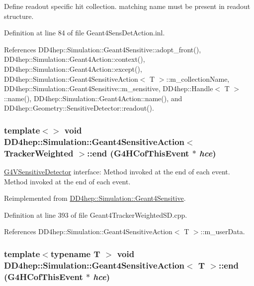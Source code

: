 Define readout specific hit collection. matching name must be present in readout structure. 

Definition at line 84 of file Geant4SensDetAction.inl.

References DD4hep::Simulation::Geant4Sensitive::adopt\_\-front(), DD4hep::Simulation::Geant4Action::context(), DD4hep::Simulation::Geant4Action::except(), DD4hep::Simulation::Geant4SensitiveAction$<$ T $>$::m\_\-collectionName, DD4hep::Simulation::Geant4Sensitive::m\_\-sensitive, DD4hep::Handle$<$ T $>$::name(), DD4hep::Simulation::Geant4Action::name(), and DD4hep::Geometry::SensitiveDetector::readout().\hypertarget{class_d_d4hep_1_1_simulation_1_1_geant4_sensitive_action_a09d62eb1a5e2511537b371585e3f60a5}{
\subsubsection[{end}]{\setlength{\rightskip}{0pt plus 5cm}template$<$$>$ void {\bf DD4hep::Simulation::Geant4SensitiveAction}$<$ {\bf TrackerWeighted} $>$::end (G4HCofThisEvent $\ast$ {\em hce})}}
\label{class_d_d4hep_1_1_simulation_1_1_geant4_sensitive_action_a09d62eb1a5e2511537b371585e3f60a5}


\hyperlink{class_g4_v_sensitive_detector}{G4VSensitiveDetector} interface: Method invoked at the end of each event. Method invoked at the end of each event. 

Reimplemented from \hyperlink{class_d_d4hep_1_1_simulation_1_1_geant4_sensitive_abcce05101539a9941c06aada4625a608}{DD4hep::Simulation::Geant4Sensitive}.

Definition at line 393 of file Geant4TrackerWeightedSD.cpp.

References DD4hep::Simulation::Geant4SensitiveAction$<$ T $>$::m\_\-userData.\hypertarget{class_d_d4hep_1_1_simulation_1_1_geant4_sensitive_action_a144120acdde58a966bd627c572ca191d}{
\subsubsection[{end}]{\setlength{\rightskip}{0pt plus 5cm}template$<$typename T $>$ void {\bf DD4hep::Simulation::Geant4SensitiveAction}$<$ T $>$::end (G4HCofThisEvent $\ast$ {\em hce})}}
\label{class_d_d4hep_1_1_simulation_1_1_geant4_sensitive_action_a144120acdde58a966bd627c572ca191d}



